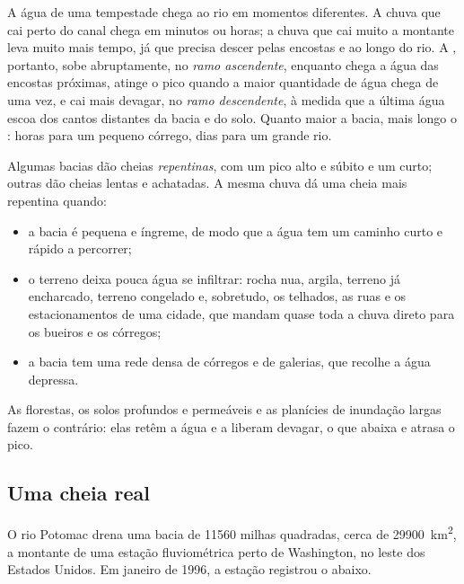 A água de uma tempestade chega ao rio em momentos diferentes. A chuva que cai
perto do canal chega em minutos ou horas; a chuva que cai muito a montante
leva muito mais tempo, já que precisa descer pelas encostas e ao longo do
rio. A , portanto, sobe abruptamente, no \emph{ramo ascendente},
enquanto chega a água das encostas próximas, atinge o pico quando a maior
quantidade de água chega de uma vez, e cai mais devagar, no \emph{ramo
descendente}, à medida que a última água escoa dos cantos distantes da
bacia e do solo. Quanto maior a bacia, mais longo o : horas
para um pequeno córrego, dias para um grande rio.

Algumas bacias dão cheias \emph{repentinas}, com um pico alto e súbito e um
 curto; outras dão cheias lentas e achatadas. A mesma chuva
dá uma cheia mais repentina quando:
\begin{itemize}
  \item a bacia é pequena e íngreme, de modo que a água tem um caminho curto
        e rápido a percorrer;
  \item o terreno deixa pouca água se infiltrar: rocha nua, argila, terreno
        já encharcado, terreno congelado e, sobretudo, os telhados, as ruas
        e os estacionamentos de uma cidade, que mandam quase toda a chuva
        direto para os bueiros e os córregos;
  \item a bacia tem uma rede densa de córregos e de galerias, que recolhe a
        água depressa.
\end{itemize}
As florestas, os solos profundos e permeáveis e as planícies de inundação
largas fazem o contrário: elas retêm a água e a liberam devagar, o que
abaixa e atrasa o pico.

\subsection*{Uma cheia real}

O rio Potomac drena uma bacia de \num{11560} milhas quadradas, cerca de
\qty{29900}{km^2}, a montante de uma estação fluviométrica perto de
Washington, no leste dos Estados Unidos. Em janeiro de 1996, a estação
registrou o  abaixo.

